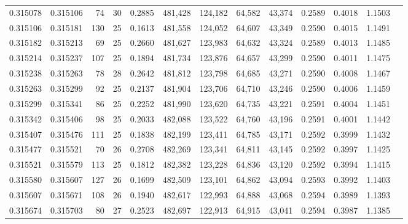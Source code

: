 \begin{tabular}{rrrrrrrrrrrrr}
0.315078 & 0.315106 &    74 &  30 &                                     0.2885 & 481,428 & 124,182 &  64,582 &  43,374 & 0.2589 & 0.4018 & 1.1503 \\
0.315106 & 0.315181 &   130 &  25 &                                     0.1613 & 481,558 & 124,052 &  64,607 &  43,349 & 0.2590 & 0.4015 & 1.1491 \\
0.315182 & 0.315213 &    69 &  25 &                                     0.2660 & 481,627 & 123,983 &  64,632 &  43,324 & 0.2589 & 0.4013 & 1.1485 \\
0.315214 & 0.315237 &   107 &  25 &                                     0.1894 & 481,734 & 123,876 &  64,657 &  43,299 & 0.2590 & 0.4011 & 1.1475 \\
0.315238 & 0.315263 &    78 &  28 &                                     0.2642 & 481,812 & 123,798 &  64,685 &  43,271 & 0.2590 & 0.4008 & 1.1467 \\
0.315263 & 0.315299 &    92 &  25 &                                     0.2137 & 481,904 & 123,706 &  64,710 &  43,246 & 0.2590 & 0.4006 & 1.1459 \\
0.315299 & 0.315341 &    86 &  25 &                                     0.2252 & 481,990 & 123,620 &  64,735 &  43,221 & 0.2591 & 0.4004 & 1.1451 \\
0.315342 & 0.315406 &    98 &  25 &                                     0.2033 & 482,088 & 123,522 &  64,760 &  43,196 & 0.2591 & 0.4001 & 1.1442 \\
0.315407 & 0.315476 &   111 &  25 &                                     0.1838 & 482,199 & 123,411 &  64,785 &  43,171 & 0.2592 & 0.3999 & 1.1432 \\
0.315477 & 0.315521 &    70 &  26 &                                     0.2708 & 482,269 & 123,341 &  64,811 &  43,145 & 0.2592 & 0.3997 & 1.1425 \\
0.315521 & 0.315579 &   113 &  25 &                                     0.1812 & 482,382 & 123,228 &  64,836 &  43,120 & 0.2592 & 0.3994 & 1.1415 \\
0.315580 & 0.315607 &   127 &  26 &                                     0.1699 & 482,509 & 123,101 &  64,862 &  43,094 & 0.2593 & 0.3992 & 1.1403 \\
0.315607 & 0.315671 &   108 &  26 &                                     0.1940 & 482,617 & 122,993 &  64,888 &  43,068 & 0.2594 & 0.3989 & 1.1393 \\
0.315674 & 0.315703 &    80 &  27 &                                     0.2523 & 482,697 & 122,913 &  64,915 &  43,041 & 0.2594 & 0.3987 & 1.1385 \\

\end{tabular}
